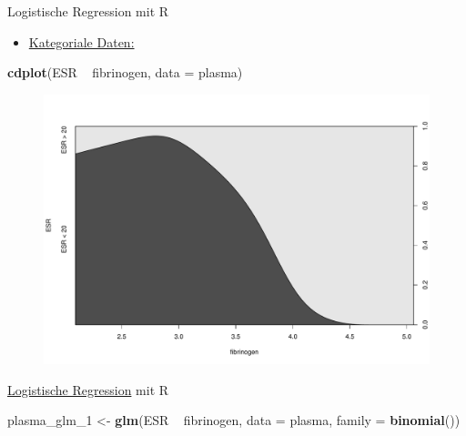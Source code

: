 \documentclass[ignorenonframetext,]{beamer}
\newenvironment{Shaded}{}{}
\newcommand{\KeywordTok}[1]{\textcolor[rgb]{0.00,0.44,0.13}{\textbf{{#1}}}}
\newcommand{\DataTypeTok}[1]{\textcolor[rgb]{0.56,0.13,0.00}{{#1}}}
\newcommand{\StringTok}[1]{\textcolor[rgb]{0.25,0.44,0.63}{{#1}}}
\newcommand{\NormalTok}[1]{{#1}}
\providecommand{\tightlist}{%
\setlength{\itemsep}{0pt}\setlength{\parskip}{0pt}}
\begin{document}
\begin{frame}[fragile]{Logistische Regression mit R}

\begin{itemize}
\tightlist
\item
  \href{http://homepage.univie.ac.at/herbert.nagel/KategorialeDaten.pdf}{Kategoriale
  Daten:}
\end{itemize}

\begin{Shaded}
\begin{Highlighting}[]
\KeywordTok{cdplot}\NormalTok{(ESR ~}\StringTok{ }\NormalTok{fibrinogen, }\DataTypeTok{data =} \NormalTok{plasma)}
\end{Highlighting}
\end{Shaded}

\begin{figure}[htbp]
\centering
\includegraphics{RSocialScience2_files/figure-beamer/unnamed-chunk-93-1.pdf}
\caption{}
\end{figure}

\end{frame}

\begin{frame}[fragile]{\href{http://ww2.coastal.edu/kingw/statistics/R-tutorials/logistic.html}{Logistische
Regression} mit R}

\begin{Shaded}
\begin{Highlighting}[]
\NormalTok{plasma_glm_1 <-}\StringTok{ }\KeywordTok{glm}\NormalTok{(ESR ~}\StringTok{ }\NormalTok{fibrinogen, }\DataTypeTok{data =} \NormalTok{plasma, }
                    \DataTypeTok{family =} \KeywordTok{binomial}\NormalTok{())}
\end{Highlighting}
\end{Shaded}

\end{frame}
\end{document}

